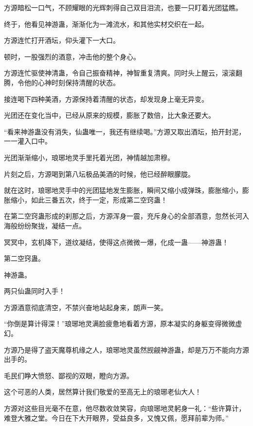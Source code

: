 \begin{this_body}
方源暗松一口气，不顾耀眼的光辉刺得自己双目泪流，也要一只盯着光团猛瞧。

终于，他看见神游蛊，渐渐化为一滩流水，和其他实材交织在一起。

方源连忙打开酒坛，仰头灌下一大口。

顿时，一股强烈的酒意，冲击他的整个身心。

方源连忙驱使神清蛊，令自己振奋精神，神智重复清爽。同时头上醒云，滚滚翻腾，令他的心神时刻保持清醒的状态。

接连喝下四种美酒，方源保持着清醒的状态，却发现身上毫无异变。

光团还在变化当中，已经从原来的规模，膨胀了数倍，比大象还要大。

“看来神游蛊没有消失，仙蛊唯一，我还有继续喝。”方源又取出酒坛，拍开封泥，一一灌入口中。

光团渐渐缩小，琅琊地灵手里托着光团，神情越加肃穆。

片刻之后，方源喝到第八坛极品美酒的时候，他已经醉眼朦胧。

就在这时，琅琊地灵手中的光团猛地发生膨胀，瞬间又缩小成弹珠，膨胀缩小，膨胀缩小，如此三番五次，终于一定，形成第二空窍蛊！

在第二空窍蛊形成的刹那之后，方源浑身一震，充斥身心的全部酒意，忽然长河入海般纷纷聚拢，凝结一点。

冥冥中，玄机降下，道纹凝结，使得这点微微一爆，化成一蛊——神游蛊！

第二空窍蛊。

神游蛊。

两只仙蛊同时入手！

方源酒意彻底清空，不禁兴奋地站起身来，朗声一笑。

“你倒是算计得深！”琅琊地灵满脸疲惫地看着方源，原本凝实的身躯变得微微虚幻。

方源乃是得了盗天魔尊机缘之人，琅琊地灵虽然觊觎神游蛊，却是万万不能向方源出手的。

毛民们睁大愤怒、鄙视的双眼，瞪向方源。

这个可恶的人类，居然算计我们敬爱的至高无上的琅琊老仙大人！

方源对这些目光毫不在意，他尽数收敛笑容，向琅琊地灵躬身一礼：“些许算计，难登大雅之堂。今日在下大开眼界，受益良多，又愧又佩，愿拜前辈为师。”

\end{this_body}

